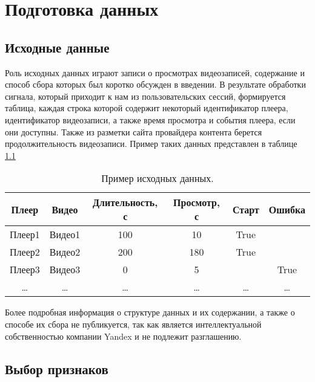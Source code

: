 \chapter{Подготовка данных}

\section{Исходные данные}

Роль исходных данных играют записи о просмотрах видеозаписей, содержание и способ сбора которых был коротко обсужден в введении. В результате обработки сигнала, который приходит к нам из пользовательских сессий, формируется таблица, каждая строка которой содержит некоторый идентификатор плеера, идентификатор видеозаписи, а также время просмотра и события плеера, если они доступны. Также из разметки сайта провайдера контента берется продолжительность видеозаписи. Пример таких данных представлен в таблице \ref{tab:raw_data}

\begin{table}[h]
    \centering
    \begin{tabular}{|c|c|c|c|c|c|}
        \hline
        Плеер & Видео & Длительность, с & Просмотр, с & Старт & Ошибка \\
        \hline
        Плеер1 & Видео1 & 100 & 10 & True & \\
        \hline
        Плеер2 & Видео2 & 200 & 180 & True & \\
        \hline
        Плеер3 & Видео3 & 0 & 5 & & True \\
        \hline
        \ldots & \ldots & \ldots & \ldots & \ldots & \ldots \\
        \hline
    \end{tabular}
    \caption{Пример исходных данных.}
    \label{tab:raw_data}
\end{table}


Более подробная информация о структуре данных и их содержании, а также о способе их сбора не публикуется, так как является интеллектуальной собственностью компании Yandex и не подлежит разглашению.

\section{Выбор признаков}

